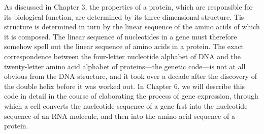 As discussed in Chapter 3, the properties of a protein, which are responsible for its
biological function, are determined by its three-dimensional structure. Tis structure is determined in turn by the linear sequence of the amino acids of which it is
composed. The linear sequence of nucleotides in a gene must therefore somehow
spell out the linear sequence of amino acids in a protein. The exact correspondence between the four-letter nucleotide alphabet of DNA and the twenty-letter
amino acid alphabet of proteins—the genetic code—is not at all obvious from the
DNA structure, and it took over a decade after the discovery of the double helix
before it was worked out. In Chapter 6, we will describe this code in detail in the
course of elaborating the process of gene expression, through which a cell converts
the nucleotide sequence of a gene frst into the nucleotide sequence of an RNA
molecule, and then into the amino acid sequence of a protein.

